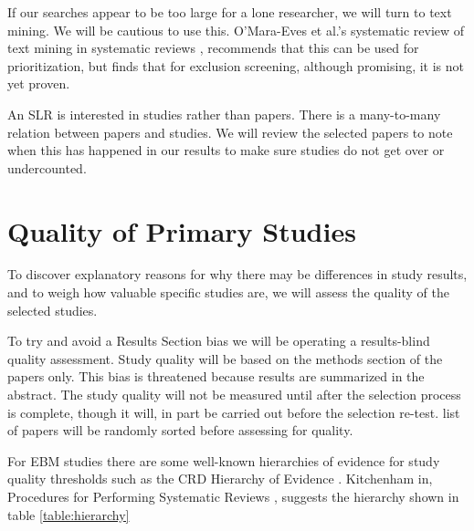 If our searches appear to be too large for a lone researcher, we will turn to text mining.  
We will be cautious to use this.
O'Mara-Eves et al.'s systematic review of text mining in systematic reviews \cite{OMara-Eves_2015}, recommends that this can be used for prioritization, but finds that for exclusion screening, although promising, it is not yet proven.

An SLR is interested in studies rather than papers.
There is a many-to-many relation between papers and studies.
We will review the selected papers to note when this has happened in our results to make sure studies do not get over or undercounted.

\section{Quality of Primary Studies}
To discover explanatory reasons for why there may be differences in study results, and to weigh how valuable specific studies are, we will assess the quality of the selected studies.

To try and avoid a Results Section bias we will be operating a results-blind quality assessment.  
Study quality will be based on the methods section of the papers only.
This bias is threatened because results are summarized in the abstract.  
The study quality will not be measured until after the selection process is complete, though it will, in part be carried out before the selection re-test.
list of papers will be randomly sorted before assessing for quality.

For EBM studies there are some well-known hierarchies of evidence for study quality thresholds such as the CRD Hierarchy of Evidence \cite{Cochrane_2019}.
Kitchenham in, Procedures for Performing Systematic Reviews \cite{Kitchenham_2004_2}, suggests the hierarchy shown in table \ref{table:hierarchy}

